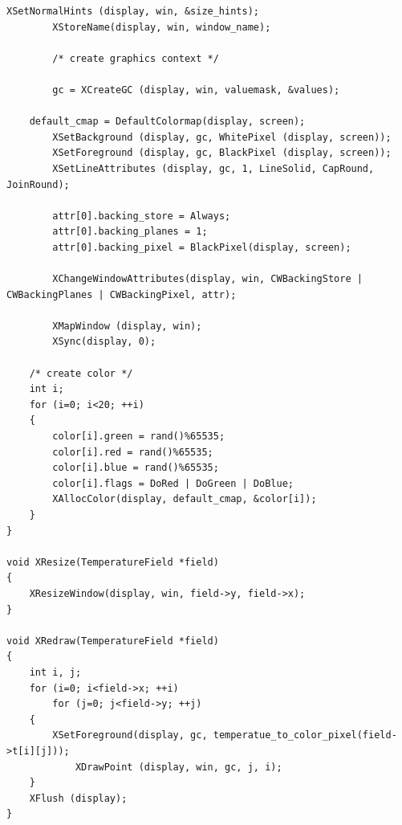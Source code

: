 \documentclass{acm_proc_article-sp}
\begin{document}
\begin{lstlisting}[caption=display.h]
        XSetNormalHints (display, win, &size_hints);
        XStoreName(display, win, window_name);

        /* create graphics context */

        gc = XCreateGC (display, win, valuemask, &values);

	default_cmap = DefaultColormap(display, screen);
        XSetBackground (display, gc, WhitePixel (display, screen));
        XSetForeground (display, gc, BlackPixel (display, screen));
        XSetLineAttributes (display, gc, 1, LineSolid, CapRound, JoinRound);

        attr[0].backing_store = Always;
        attr[0].backing_planes = 1;
        attr[0].backing_pixel = BlackPixel(display, screen);

        XChangeWindowAttributes(display, win, CWBackingStore | CWBackingPlanes | CWBackingPixel, attr);

        XMapWindow (display, win);
        XSync(display, 0); 

	/* create color */
	int i;
	for (i=0; i<20; ++i)
	{
	    color[i].green = rand()%65535;
	    color[i].red = rand()%65535;
	    color[i].blue = rand()%65535;
	    color[i].flags = DoRed | DoGreen | DoBlue;
	    XAllocColor(display, default_cmap, &color[i]);
	}
}

void XResize(TemperatureField *field)
{
    XResizeWindow(display, win, field->y, field->x);
}

void XRedraw(TemperatureField *field)
{
    int i, j;
    for (i=0; i<field->x; ++i)
        for (j=0; j<field->y; ++j)
	{
		XSetForeground(display, gc, temperatue_to_color_pixel(field->t[i][j]));
	        XDrawPoint (display, win, gc, j, i);
	}
    XFlush (display);
}


\end{lstlisting}
\end{document}
